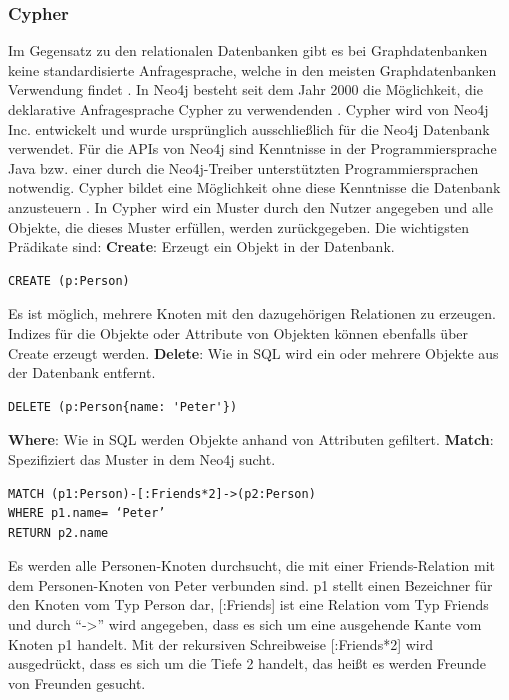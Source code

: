 \subsubsection{Cypher}
Im Gegensatz zu den relationalen Datenbanken gibt es bei Graphdatenbanken keine standardisierte Anfragesprache, welche in den meisten Graphdatenbanken Verwendung findet \parencite{han2011survey}. In Neo4j besteht seit dem Jahr 2000 die Möglichkeit, die deklarative Anfragesprache Cypher zu verwendenden  \parencite{francis2018cypher}. Cypher wird von Neo4j Inc. entwickelt und wurde ursprünglich ausschließlich für die Neo4j Datenbank verwendet. Für die APIs von Neo4j sind Kenntnisse in der Programmiersprache Java bzw. einer durch die Neo4j-Treiber unterstützten Programmiersprachen notwendig. Cypher bildet eine Möglichkeit ohne diese Kenntnisse die  Datenbank anzusteuern \parencite{vukotic2015neo4j}. In Cypher wird ein Muster durch den Nutzer angegeben und alle Objekte, die dieses Muster erfüllen, werden zurückgegeben. Die wichtigsten  Prädikate sind: \newline
\textbf{Create}: Erzeugt ein Objekt in der Datenbank. 
\begin{Verbatim}[frame=single]
CREATE (p:Person)
\end{Verbatim}
Es ist möglich, mehrere Knoten mit den dazugehörigen Relationen zu erzeugen. Indizes für die Objekte oder Attribute von Objekten können ebenfalls über Create erzeugt werden.\newline
\textbf{Delete}: Wie in SQL  wird ein  oder mehrere Objekte aus der Datenbank entfernt.
\begin{Verbatim}[frame=single]
DELETE (p:Person{name: 'Peter'})  
\end{Verbatim}
\textbf{Where}: Wie in SQL werden Objekte anhand von Attributen gefiltert. \newline
\textbf{Match}: Spezifiziert das Muster in dem Neo4j sucht.
\begin{Verbatim}[frame=single]
MATCH (p1:Person)-[:Friends*2]->(p2:Person) 
WHERE p1.name= ‘Peter’ 
RETURN p2.name
\end{Verbatim}
Es werden alle Personen-Knoten durchsucht, die mit einer Friends-Relation mit dem Personen-Knoten von Peter verbunden sind. p1 stellt einen Bezeichner für den Knoten vom Typ Person dar, [:Friends] ist eine Relation vom Typ Friends und durch “->” wird angegeben, dass es sich um eine ausgehende Kante vom Knoten p1 handelt. Mit der rekursiven Schreibweise [:Friends*2] wird ausgedrückt, dass es sich um die Tiefe 2 handelt, das heißt es werden Freunde von Freunden gesucht. \newline
